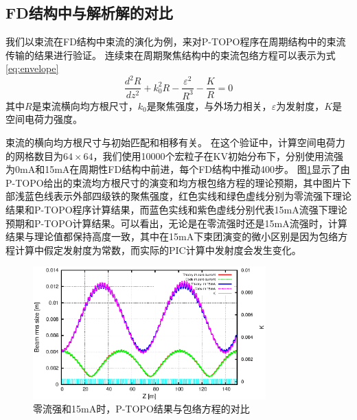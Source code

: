 \subsection{FD结构中与解析解的对比}
我们以束流在FD结构中束流的演化为例，来对P-TOPO程序在周期结构中的束流传输的结果进行验证。
连续束在周期聚焦结构中的束流包络方程可以表示为式\ref{eq:envelope}\cite{wangler1998particle,chen1994nonlinear}
\begin{equation}\label{eq:envelope}
  \frac{{{d}^{2}}R}{d{{z}^{2}}}+k_{0}^{2}R-\frac{{{\varepsilon }^{2}}}{{{R}^{3}}}-\frac{K}{R}=0
\end{equation}
其中$R$是束流横向均方根尺寸，$k_0$是聚焦强度，与外场力相关，$\varepsilon$为发射度，$K$是空间电荷力强度。

束流的横向均方根尺寸与初始匹配和相移有关。
在这个验证中，计算空间电荷力的网格数目为$64 \times 64$，我们使用10000个宏粒子在KV初始分布下，分别使用流强为0mA和15mA在周期性FD结构中前进，每个FD结构中推动400步。
图\ref{fig:P_TOPO_verification2}显示了由P-TOPO给出的束流均方根尺寸的演变和均方根包络方程的理论预期，其中图片下部浅蓝色线表示外部四级铁的聚焦强度，红色实线和绿色虚线分别为零流强下理论结果和P-TOPO程序计算结果，而蓝色实线和紫色虚线分别代表15mA流强下理论预期和P-TOPO计算结果。可以看出，无论是在零流强时还是15mA流强时，计算结果与理论值都保持高度一致，其中在15mA下束团演变的微小区别是因为包络方程计算中假定发射度为常数，而实际的PIC计算中发射度会发生变化。

\begin{figure}[!htb]
    \centering
    \includegraphics[width=0.8\textwidth]{Img/P_TOPO_verification2.eps}
    \caption{零流强和15mA时，P-TOPO结果与包络方程的对比}
    \label{fig:P_TOPO_verification2}
\end{figure}



